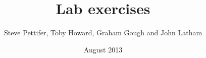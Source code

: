 \documentclass[11pt, a4paper]{report}
\title{Lab exercises}
\date{August 2013}
\author{Steve Pettifer, Toby Howard, Graham Gough and John Latham}
\begin{document}

\setcounter{chapter}{-1}
\renewcommand{\chaptername}{Welcome Lab Session}

\renewcommand{\chaptername}{Intro Lab Session}



\renewcommand{\chaptername}{COMP10120 Lab Session}
\setcounter{chapter}{0}







\printbibliography
\end{document}
